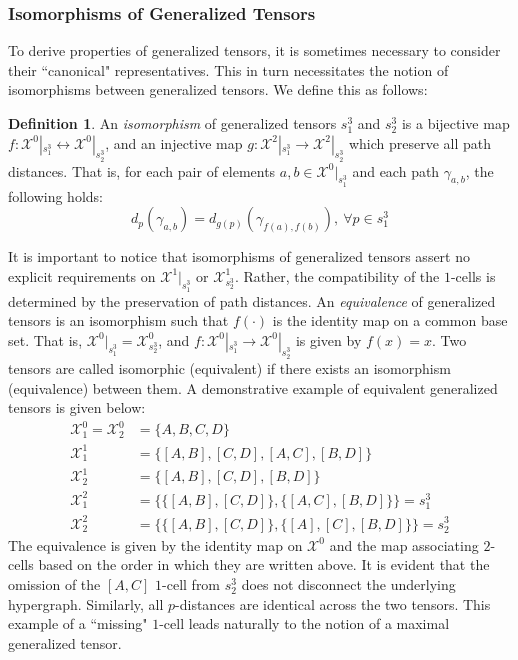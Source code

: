 \documentclass{article}
\theoremstyle{plain}
\theoremstyle{definition}
\newtheorem{definition}[theorem]{Definition}
\theoremstyle{remark}
\newcommand{\cX}{\mathcal{X}}
\begin{document}
\subsubsection{\label{sec:GenTenIsos_Apdx}Isomorphisms of Generalized Tensors}
To derive properties of generalized tensors, it is sometimes necessary to consider their ``canonical" representatives. This in turn necessitates the notion of isomorphisms between generalized tensors. We define this as follows:
\begin{definition}
	An \textit{isomorphism} of generalized tensors $s^3_1$ and $s^3_2$ is a bijective map $f: \cX^0|_{s^3_1} \leftrightarrow \cX^0|_{s^3_2}$, and an injective map $g: \cX^2|_{s^3_1} \rightarrow \cX^2|_{s^3_2}$ which preserve all path distances. That is, for each pair of elements $a, b \in \cX^0|_{s^3_1}$ and each path $\gamma_{a,b}$, the following holds:
	\begin{equation*}
		d_p(\gamma_{a,b}) = d_{g(p)}(\gamma_{f(a), f(b)}), \ \forall p \in s^3_1
	\end{equation*}
\end{definition}
It is important to notice that isomorphisms of generalized tensors assert no explicit requirements on $\cX^1|_{s^3_1}$ or $\cX^1_{s^3_2}$. Rather, the compatibility of the $1$-cells is determined by the preservation of path distances. An \textit{equivalence} of generalized tensors is an isomorphism such that $f(\cdot)$ is the identity map on a common base set. That is, $\cX^0|_{s^3_1} = \cX^0_{s^3_2}$, and $f: \cX^0|_{s^3_1} \rightarrow \cX^0|_{s^3_2}$ is given by $f(x) = x$. Two tensors are called isomorphic (equivalent) if there exists an isomorphism (equivalence) between them. A demonstrative example of equivalent generalized tensors is given below:
\begin{equation*}
	\begin{aligned}
		\cX^0_1 = \cX^0_2 &= \{A, B, C, D\}\\
		\cX^1_1 &= \big\{ [A, B], [C, D], [A, C], [B, D] \big\}\\
		\cX^1_2 &= \big\{ [A, B], [C, D], [B, D] \big\}\\
		\cX^2_1 &= \bigg\{ \big\{ [A, B], [C, D] \big\}, \big\{ [A, C], [B, D] \big\} \bigg\} = s^3_1\\
		\cX^2_2 &= \bigg\{ \big\{ [A, B], [C, D] \big\}, \big\{ [A], [C], [B, D] \big\} \bigg\} = s^3_2
	\end{aligned}
\end{equation*}
The equivalence is given by the identity map on $\cX^0$ and the map associating $2$-cells based on the order in which they are written above. It is evident that the omission of the $[A, C]$ $1$-cell from $s^3_2$ does not disconnect the underlying hypergraph. Similarly, all $p$-distances are identical across the two tensors. This example of a ``missing" $1$-cell leads naturally to the notion of a maximal generalized tensor.
\end{document}
